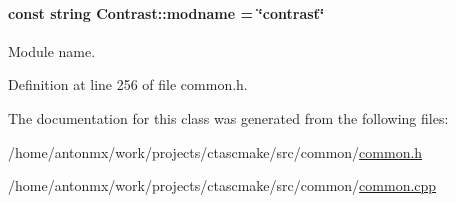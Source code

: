 \hypertarget{classContrast_ad080deac5626be04e6f0b0148564cd56}{
\paragraph[{modname}]{\setlength{\rightskip}{0pt plus 5cm}const string {\bf Contrast::modname} = \char`\"{}contrast\char`\"{}}\hfill}
\label{classContrast_ad080deac5626be04e6f0b0148564cd56}


Module name. 



Definition at line 256 of file common.h.



The documentation for this class was generated from the following files:\begin{DoxyCompactItemize}
\item 
/home/antonmx/work/projects/ctascmake/src/common/\hyperlink{common_8h}{common.h}\item 
/home/antonmx/work/projects/ctascmake/src/common/\hyperlink{common_8cpp}{common.cpp}\end{DoxyCompactItemize}
